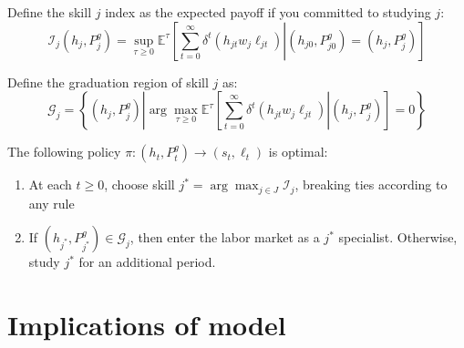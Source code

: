 \documentclass[10 pt]{article}
\newcommand{\sbr}[1]{\left[ #1 \right]}
\newcommand{\pr}[1]{\left( #1 \right)}
\newcommand{\ce}[2]{\left[\left. #1 \right\vert #2 \right]}
\begin{document}
Define the skill $j$ index as the expected payoff if you committed to studying $j$:
\begin{equation*}
\mathcal{I}_j (h_j, P_j^g) = \sup_{\tau \geq 0} \mathbb{E}^\tau
\ce{
   \sum_{t=0}^\infty \delta^t \pr{h_{jt} w_j \ell_{jt} }}
   {(h_{j0}, P_{j0}^g) = (h_j, P_j^g)
}
\end{equation*}

Define the graduation region of skill $j$ as: 
\begin{equation*}
\mathcal{G}_j = \left\{ (h_j, P_j^g) \left\vert
   \arg \max_{\tau \geq 0} 
   \mathbb{E}^\tau \ce{\sum_{t=0}^\infty \delta^t \pr{h_{jt} w_j \ell_{jt} }}
   {(h_j, P_j^g)} = 0
   \right. \right\}
\end{equation*}

The following policy $\pi: (h_t, P_t^g) \to (s_t, \ell_t)$ is optimal: 
\begin{enumerate}
    \item At each $t \geq 0$, choose skill $j^* = \arg \max_{j \in J} \mathcal{I}_j$, breaking ties according to any rule
    \item If $(h_{j^*}, P_{j^*}^g) \in \mathcal{G}_{j}$, then enter the labor market as a $j^*$ specialist. Otherwise, study $j^*$ for an additional period.  
\end{enumerate}


\section{Implications of model}
\end{document}
